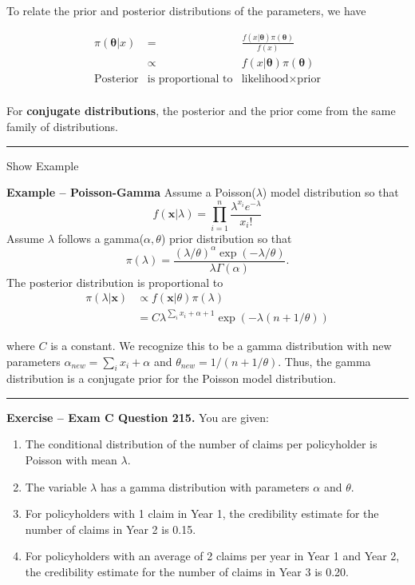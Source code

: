 \documentclass[]{book}
\providecommand{\tightlist}{%
  \setlength{\itemsep}{0pt}\setlength{\parskip}{0pt}}
\theoremstyle{definition}
\theoremstyle{definition}
\theoremstyle{definition}
\theoremstyle{remark}
\begin{document}
To relate the prior and posterior distributions of the parameters, we
have

\[\begin{array}{ccc}
\pi(\boldsymbol \theta | x) & = & \frac{f(x|\boldsymbol \theta )\pi(\boldsymbol \theta)}{f(x)}  \\
 & \propto  & f(x|\boldsymbol \theta ) \pi(\boldsymbol \theta) \\
\text{Posterior} & \text{is proportional to} & \text{likelihood} \times \text{prior} \\
\end{array}\]

For \textbf{conjugate distributions}, the posterior and the prior come
from the same family of distributions.

\begin{center}\rule{0.5\linewidth}{\linethickness}\end{center}

Show Example

\hypertarget{toggleExampleConj}{}
\textbf{Example -- Poisson-Gamma} Assume a Poisson(\(\lambda\)) model
distribution so that
\[f(\mathbf{x} | \lambda) = \prod_{i=1}^n \frac{\lambda^{x_i} e^{-\lambda}}{x_i!}\]
Assume \(\lambda\) follows a gamma(\(\alpha, \theta\)) prior
distribution so that
\[\pi(\lambda) = \frac{\left(\lambda/\theta\right)^{\alpha} \exp(-\lambda/\theta)}{\lambda \Gamma(\alpha)}.\]
The posterior distribution is proportional to \[\begin{aligned}
\pi(\lambda | \mathbf{x}) &\propto f(\mathbf{x}|\theta ) \pi(\lambda) \\
&= C \lambda^{\sum_i x_i + \alpha +1} \exp(-\lambda(n+1/\theta))
\end{aligned}\]

where \(C\) is a constant. We recognize this to be a gamma distribution
with new parameters \(\alpha_{new} = \sum_i x_i + \alpha\) and
\(\theta_{new} = 1/(n + 1/\theta)\). Thus, the gamma distribution is a
conjugate prior for the Poisson model distribution.

\begin{center}\rule{0.5\linewidth}{\linethickness}\end{center}

\textbf{Exercise -- Exam C Question 215.} You are given:

\begin{enumerate}
\def\labelenumi{(\roman{enumi})}
\tightlist
\item
  The conditional distribution of the number of claims per policyholder
  is Poisson with mean \(\lambda\).
\item
  The variable \(\lambda\) has a gamma distribution with parameters
  \(\alpha\) and \(\theta\).
\item
  For policyholders with 1 claim in Year 1, the credibility estimate for
  the number of claims in Year 2 is 0.15.
\item
  For policyholders with an average of 2 claims per year in Year 1 and
  Year 2, the credibility estimate for the number of claims in Year 3 is
  0.20.
\end{enumerate}
\end{document}
